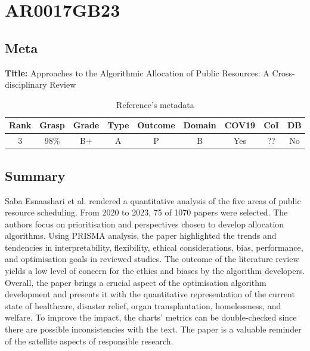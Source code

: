 \section{ AR0017GB23 }


\subsection{Meta}

    \textbf{Title:}
    Approaches to the Algorithmic Allocation of Public Resources: A Cross-disciplinary Review
    
    \begin{table}[H]
        \centering
        \begin{tabular}{|c|c|c|c|c|c|c|c|c|}
            \hline
                \textbf{Rank} & \textbf{Grasp} & \textbf{Grade} & \textbf{Type} & \textbf{Outcome} & \textbf{Domain} & \textbf{COV19} & \textbf{CoI} & \textbf{DB} \\
            \hline
                3 & 98\% & B+ & A & P & B & Yes & ?? & No \\
            \hline
        \end{tabular}
        \caption{Reference's metadata}
        \label{tab:AR0017GB23}
    \end{table}

\subsection{Summary}
    Saba Esnaashari et al. \cite{x121} rendered a quantitative analysis of the five areas of public resource scheduling. From 2020 to 2023, 75 of 1070 papers were selected. The authors focus on prioritisation and perspectives chosen to develop allocation algorithms. Using PRISMA analysis, the paper highlighted the trends and tendencies in interpretability, flexibility, ethical considerations, bias, performance, and optimisation goals in reviewed studies. The outcome of the literature review yields a low level of concern for the ethics and biases by the algorithm developers. Overall, the paper brings a crucial aspect of the optimisation algorithm development and presents it with the quantitative representation of the current state of healthcare, disaster relief, organ transplantation, homelessness, and welfare. To improve the impact, the charts' metrics can be double-checked since there are possible inconsistencies with the text. The paper is a valuable reminder of the satellite aspects of responsible research.

